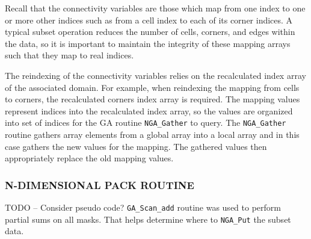 Recall that the connectivity variables are those which map from one index to
one or more other indices such as from a cell index to each of its corner
indices.  A typical subset operation reduces the number of cells, corners, and
edges within the data, so it is important to maintain the integrity of these
mapping arrays such that they map to real indices.

The reindexing of the connectivity variables relies on the recalculated index
array of the associated domain.  For example, when reindexing the mapping from
cells to corners, the recalculated corners index array is required.  The
mapping values represent indices into the recalculated index array, so the
values are organized into set of indices for the GA routine \verb=NGA_Gather=
to query.  The \verb=NGA_Gather= routine gathers array elements from a global
array into a local array and in this case gathers the new values for the
mapping.  The gathered values then appropriately replace the old mapping
values.

\subsubsection{N-DIMENSIONAL PACK ROUTINE}
\label{section:alg_pack}

TODO -- Consider pseudo code?  \verb=GA_Scan_add= routine was used to perform
partial sums on all masks. That helps determine where to \verb=NGA_Put= the
subset data.

